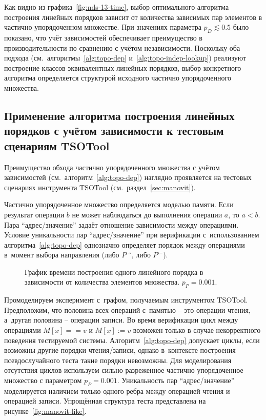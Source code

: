 Как видно из графика~\ref{fig:nds-13-time}, выбор оптимального
алгоритма построения линейных порядков зависит от количества
зависимых пар элементов в частично упорядоченном множестве. При
значениях параметра $p_{D} \lesssim 0.5$ было показано, что учёт
зависимостей обеспечивает преимущество в
производительности по сравнению с учётом независимости. Поскольку оба
подхода (см.~алгоритмы~\ref{alg:topo-dep}
и~\ref{alg:topo-indep-lookup}) реализуют построение классов
эквивалентных линейных порядков, выбор конкретного алгоритма
определяется структурой исходного частично упорядоченного множества.

\subsection{Применение алгоритма построения линейных порядков с
учётом зависимости к тестовым сценариям TSOTool}

Преимущество обхода частично упорядоченного множества с учётом
зависимостей (см.~алгоритм~\ref{alg:topo-dep}) наглядно проявляется на
тестовых сценариях инструмента TSOTool (см.~раздел~\ref{sec:manovit}).

Частично упорядоченное множество определяется моделью памяти. Если
результат операции $b$ не может наблюдаться до выполнения операции
$a$, то $a < b$. Пара ``адрес/значение'' задаёт отношение зависимости
между операциями. Условие уникальности пар ``адрес/значение'' при
верификации с~использованием алгоритма~\ref{alg:topo-dep} однозначно
определяет порядок между операциями в~момент выбора направления (либо
$P^{\rightarrow}$, либо $P^{\leftarrow}$).

\begin{figure}[ht]
  \centering
  \centerfloat{
    
  }
  \caption{График времени построения одного линейного порядка в
  зависимости от количества элементов множества. $p_{P} = 0.001$.}
  \label{fig:manovit-exp}
\end{figure}

Промоделируем эксперимент с~графом, получаемым инструментом TSOTool.
Предположим, что половина всех операций с~памятью -- это операции
чтения, а~другая половина -- операции записи. Во время верификации
цикл между операциями $M[x] == v$ и $M[x] := v$ возможен только в
случае некорректного поведения тестируемой системы.
Алгоритм~\ref{alg:topo-dep} допускает циклы, если возможны другие
порядки чтения/записи, однако в~контексте построения псевдослучайного
теста такие порядки невозможны. Для моделирования отсутствия циклов
используем сильно разреженное частично упорядоченное множество с
параметром $p_{P} = 0.001$. Уникальность пар ``адрес/значение''
моделируется наличием только одного ребра между операцией чтения и
операцией записи. Упрощённая структура теста представлена на
рисунке~\ref{fig:manovit-like}.

